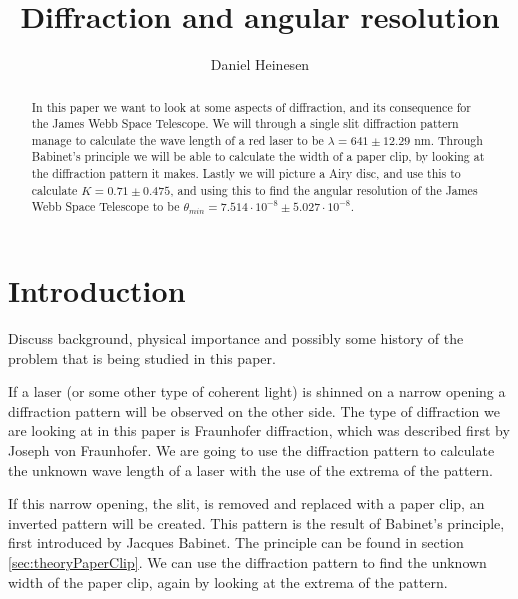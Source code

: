 \documentclass{emulateapj}
\begin{document}
\title{Diffraction and angular resolution}

\author{Daniel Heinesen}





\begin{abstract}
In this paper we want to look at some aspects of diffraction, and its consequence for the James Webb Space Telescope. We will through a single slit diffraction pattern manage to calculate the wave length of a red laser to be $\lambda = 641 \pm 12.29 \text{ nm}$. Through Babinet's principle we will be able to calculate the width of a paper clip, by looking at the diffraction pattern it makes. Lastly we will picture a Airy disc, and use this to calculate $K = 0.71 \pm 0.475$, and using this to find the angular resolution of the James Webb Space Telescope to be $\theta_{min} = 7.514\cdot 10^{-8} \pm 5.027\cdot 10^{-8}$.
\end{abstract}

\section{Introduction}
\label{sec:introduction}

Discuss background, physical importance and possibly some history of
the problem that is being studied in this paper.


If a laser (or some other type of coherent light) is shinned on a narrow opening a diffraction pattern will be observed on the other side. The type of diffraction we are looking at in this paper is Fraunhofer diffraction, which was described first by Joseph von Fraunhofer. We are going to use the diffraction pattern to calculate the unknown wave length of a laser with the use of the extrema of the pattern.

If this narrow opening, the slit, is removed and replaced with a paper clip, an inverted pattern will be created. This pattern is the result of Babinet's principle, first introduced by Jacques Babinet. The principle can be found in section \ref{sec:theoryPaperClip}. We can use the diffraction pattern to find the unknown width of the paper clip, again by looking at the extrema of the pattern.
\end{document}

